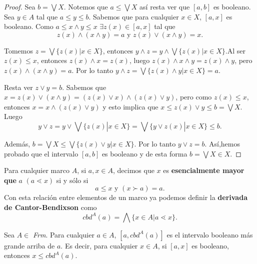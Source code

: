 \begin{proof}
Sea $b=\bigvee X$. Notemos que $a\leq\bigvee X$ así resta ver que $[a, b]$ es booleano.\\
\noindent
Sea $y\in A$ tal que $a\leq y\leq b$. Sabemos que para cualquier $x\in X$, $[a, x]$ es booleano. Como $a\leq x\wedge y\leq x$ $\exists z(x)\in [a,x]$ tal que 
$$z(x)\wedge (x\wedge y)=a\mbox{  y  }z(x)\vee (x\wedge y)=x.$$

\noindent
Tomemos $z=\bigvee\{z(x)|x\in X\}$, entonces $y\wedge z=y\wedge\bigvee\{z(x)|x\in X\}$.Al ser $z(x)\leq x$, entonces $z(x)\wedge x=z(x)$, luego $z(x)\wedge x\wedge y=z(x)\wedge y$, pero  $z(x)\wedge(x\wedge y)=a$. Por lo tanto $y\wedge z=\bigvee\{z(x)\wedge y|x\in X\}=a$.

\noindent
Resta ver $z\vee y=b$. Sabemos que $x=z(x)\vee (x\wedge y)=(z(x)\vee x)\wedge (z(x)\vee y)$, pero como $z(x)\leq x$, entonces $x=x\wedge (z(x)\vee y)$ y esto implica que $x\leq z(x)\vee y\leq b=\bigvee X.$ Luego $$y\vee z=y\vee\bigvee\{z(x)|x\in X\}=\bigvee\{y\vee z(x)|x\in X\}\leq b.$$

\noindent
Además, $b=\bigvee X\leq \bigvee\{z(x)\vee y|x\in X\}$. Por lo tanto $y\vee z=b.$ Así,hemos probado que el intervalo $[a,b]$ es booleano y de esta forma $b=\bigvee X\in X$.
\end{proof}

\begin{defn}
Para cualquier marco $A$, si $a,x\in A$, decimos que $x$  es \textbf{esencialmente mayor que} $a$ $(a\lessdot x)$ si y sólo si $$a\leq x\mbox{  y  }(x\succ a)=a.$$
Con esta relación entre elementos de un marco ya podemos definir la \textbf{derivada de Cantor-Bendixson} como $$cbd^A(a)=\bigwedge\{x\in A|a\lessdot x\}.$$
\end{defn}

\begin{lemma}\label{Lema46}
Sea $A\in$ \textit{Frm}. Para cualquier $a\in A$, $[a,cbd^A(a)]$ es el intervalo booleano más grande arriba de $a$. Es decir, para cualquier $x\in A$, si $[a,x]$ es booleano, entonces $x\leq cbd^A(a)$.
\end{lemma}

